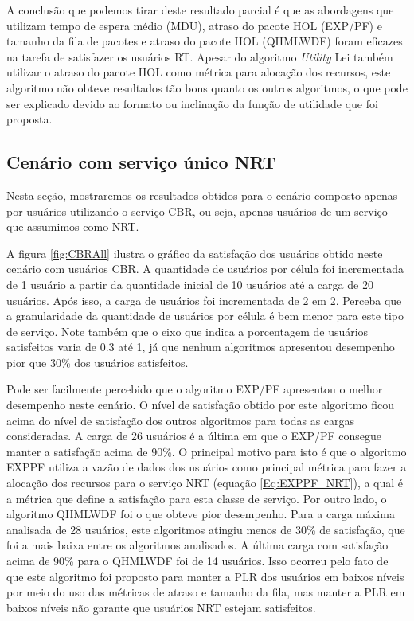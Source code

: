 A conclusão que podemos tirar deste resultado parcial é que as abordagens que utilizam tempo de espera médio (MDU), atraso do pacote HOL (EXP/PF) e tamanho da fila de pacotes e atraso do pacote HOL (QHMLWDF) foram eficazes na tarefa de satisfazer os usuários RT. Apesar do algoritmo \textit{Utility} Lei também utilizar o atraso do pacote HOL como métrica para alocação dos recursos, este algoritmo não obteve resultados tão bons quanto os outros algoritmos, o que pode ser explicado devido ao formato ou inclinação da função de utilidade que foi proposta.

\subsection{Cenário com serviço único NRT}

Nesta seção, mostraremos os resultados obtidos para o cenário composto apenas por usuários utilizando o serviço CBR, ou seja, apenas usuários de um serviço que assumimos como NRT.

A figura \ref{fig:CBRAll} ilustra o gráfico da satisfação dos usuários obtido neste cenário com usuários CBR. A quantidade de usuários por célula foi incrementada de 1 usuário a partir da quantidade inicial de 10 usuários até a carga de 20 usuários. Após isso, a carga de usuários foi incrementada de 2 em 2. Perceba que a granularidade da quantidade de usuários por célula é bem menor para este tipo de serviço. Note também que o eixo que indica a porcentagem de usuários satisfeitos varia de 0.3 até 1, já que nenhum algoritmos apresentou desempenho pior que 30\% dos usuários satisfeitos. 

Pode ser facilmente percebido que o algoritmo EXP/PF apresentou o melhor desempenho neste cenário. O nível de satisfação obtido por este algoritmo ficou acima do nível de satisfação dos outros algoritmos para todas as cargas consideradas. A carga de 26 usuários é a última em que o EXP/PF consegue manter a satisfação acima de 90\%. O principal motivo para isto é que o algoritmo EXPPF utiliza a vazão de dados dos usuários como principal métrica para fazer a alocação dos recursos para o serviço NRT (equação \ref{Eq:EXPPF_NRT}), a qual é a métrica que define a satisfação para esta classe de serviço. Por outro lado, o algoritmo QHMLWDF foi o que obteve pior desempenho. Para a carga máxima analisada de 28 usuários, este algoritmos atingiu menos de 30\% de satisfação, que foi a mais baixa entre os algoritmos analisados. A última carga com satisfação acima de 90\% para o QHMLWDF foi de 14 usuários. Isso ocorreu pelo fato de que este algoritmo foi proposto para manter a PLR dos usuários em baixos níveis por meio do uso das métricas de atraso e tamanho da fila, mas manter a PLR em baixos níveis não garante que usuários NRT estejam satisfeitos. 


